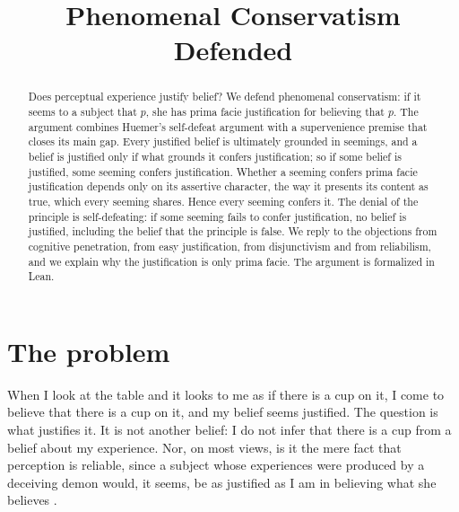 \documentclass{situationist-preprint}
\title{Phenomenal Conservatism Defended}
\begin{document}
\maketitle

\begin{abstract}
Does perceptual experience justify belief? We defend phenomenal conservatism: if it seems to a subject that $p$, she has prima facie justification for believing that $p$. The argument combines Huemer's self-defeat argument with a supervenience premise that closes its main gap. Every justified belief is ultimately grounded in seemings, and a belief is justified only if what grounds it confers justification; so if some belief is justified, some seeming confers justification. Whether a seeming confers prima facie justification depends only on its assertive character, the way it presents its content as true, which every seeming shares. Hence every seeming confers it. The denial of the principle is self-defeating: if some seeming fails to confer justification, no belief is justified, including the belief that the principle is false. We reply to the objections from cognitive penetration, from easy justification, from disjunctivism and from reliabilism, and we explain why the justification is only prima facie. The argument is formalized in Lean.
\end{abstract}

\section{The problem}

When I look at the table and it looks to me as if there is a cup on it, I come to believe that there is a cup on it, and my belief seems justified. The question is what justifies it. It is not another belief: I do not infer that there is a cup from a belief about my experience. Nor, on most views, is it the mere fact that perception is reliable, since a subject whose experiences were produced by a deceiving demon would, it seems, be as justified as I am in believing what she believes \citep{Cohen1984}.
\end{document}
